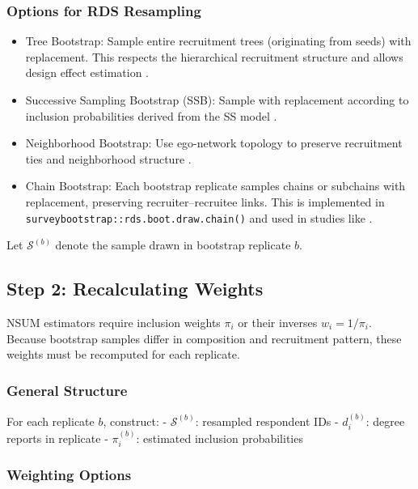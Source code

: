 \documentclass[
  12pt,
  letterpaper,
  DIV=11,
  numbers=noendperiod]{scrartcl}
\providecommand{\tightlist}{%
  \setlength{\itemsep}{0pt}\setlength{\parskip}{0pt}}
\theoremstyle{plain}
\theoremstyle{definition}
\begin{document}
\subsubsection{Options for RDS
Resampling}\label{options-for-rds-resampling}

\begin{itemize}
\tightlist
\item
  Tree Bootstrap: Sample entire recruitment trees (originating from
  seeds) with replacement. This respects the hierarchical recruitment
  structure and allows design effect estimation
  \autocite{salg06-variance}.
\item
  Successive Sampling Bootstrap (SSB): Sample with replacement according
  to inclusion probabilities derived from the SS model
  \autocite{gile11-improved}.
\item
  Neighborhood Bootstrap: Use ego-network topology to preserve
  recruitment ties and neighborhood structure
  \autocite{yauc22-neighborhood}.
\item
  Chain Bootstrap: Each bootstrap replicate samples chains or subchains
  with replacement, preserving recruiter--recruitee links. This is
  implemented in \texttt{surveybootstrap::rds.boot.draw.chain()} and
  used in studies like \textcite{weir12-comparison}.
\end{itemize}

Let \(\mathcal{S}^{(b)}\) denote the sample drawn in bootstrap replicate
\(b\).

\subsection{Step 2: Recalculating
Weights}\label{step-2-recalculating-weights}

NSUM estimators require inclusion weights \(\pi_i\) or their inverses
\(w_i = 1 / \pi_i\). Because bootstrap samples differ in composition and
recruitment pattern, these weights must be recomputed for each
replicate.

\subsubsection{General Structure}\label{general-structure}

For each replicate \(b\), construct: - \(\mathcal{S}^{(b)}\): resampled
respondent IDs - \(d_i^{(b)}\): degree reports in replicate -
\(\pi_i^{(b)}\): estimated inclusion probabilities

\subsubsection{Weighting Options}\label{weighting-options}
\end{document}
